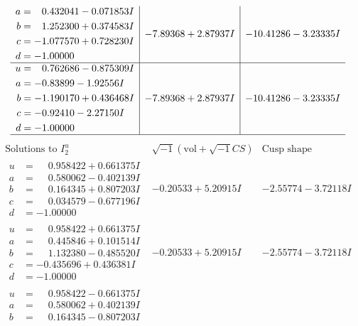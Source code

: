 \documentclass[1p]{elsarticle_modified}
\theoremstyle{definition}
\newcommand{\I}{\sqrt{-1}}
\begin{document}
$$\begin{array}{c|c|c}
\begin{aligned}
a &= \phantom{-}0.432041 - 0.071853 I \\
b &= \phantom{-}1.252300 + 0.374583 I \\
c &= -1.077570 + 0.728230 I \\
d &= -1.00000\phantom{ +0.000000I}\end{aligned}
 & -7.89368 + 2.87937 I & -10.41286 - 3.23335 I \\ \hline\begin{aligned}
u &= \phantom{-}0.762686 - 0.875309 I \\
a &= -0.83899 - 1.92556 I \\
b &= -1.190170 + 0.436468 I \\
c &= -0.92410 - 2.27150 I \\
d &= -1.00000\phantom{ +0.000000I}\end{aligned}
 & -7.89368 + 2.87937 I & -10.41286 - 3.23335 I\\
 \hline 
 \end{array}$$\newpage$$\begin{array}{c|c|c}  
\text{Solutions to }I^u_{2}& \I (\text{vol} + \sqrt{-1}CS) & \text{Cusp shape}\\
 \hline 
\begin{aligned}
u &= \phantom{-}0.958422 + 0.661375 I \\
a &= \phantom{-}0.580062 - 0.402139 I \\
b &= \phantom{-}0.164345 + 0.807203 I \\
c &= \phantom{-}0.034579 - 0.677196 I \\
d &= -1.00000\phantom{ +0.000000I}\end{aligned}
 & -0.20533 + 5.20915 I & -2.55774 - 3.72118 I \\ \hline\begin{aligned}
u &= \phantom{-}0.958422 + 0.661375 I \\
a &= \phantom{-}0.445846 + 0.101514 I \\
b &= \phantom{-}1.132380 - 0.485520 I \\
c &= -0.435696 + 0.436381 I \\
d &= -1.00000\phantom{ +0.000000I}\end{aligned}
 & -0.20533 + 5.20915 I & -2.55774 - 3.72118 I \\ \hline\begin{aligned}
u &= \phantom{-}0.958422 - 0.661375 I \\
a &= \phantom{-}0.580062 + 0.402139 I \\
b &= \phantom{-}0.164345 - 0.807203 I \\

\end{aligned}
\end{array}$$
\end{document}
